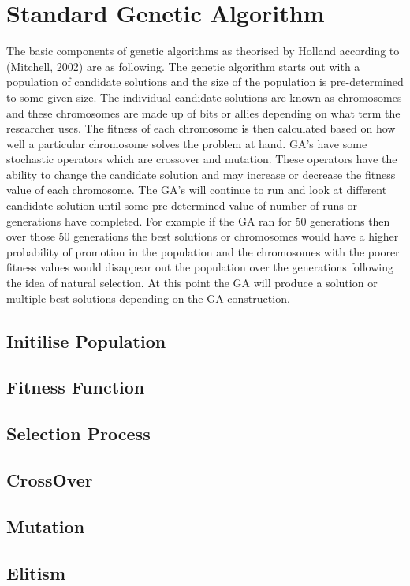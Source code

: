 \section{Standard Genetic Algorithm}
The basic components of genetic algorithms as theorised by Holland according to (Mitchell, 2002) are as following. The genetic algorithm starts out with a population of candidate solutions and the size of the population is pre-determined to some given size.  The individual candidate solutions are known as chromosomes and these chromosomes are made up of bits or allies depending on what term the researcher uses. The fitness of each chromosome is then calculated based on how well a particular chromosome solves the problem at hand.  GA’s have some stochastic operators which are crossover and mutation. These operators have the ability to change the candidate solution and may increase or decrease the fitness value of each chromosome. The GA’s will continue to run and look at different candidate solution until some pre-determined value of number of runs or generations have completed.  For example if the GA ran for 50 generations then over those 50 generations the best solutions or chromosomes would have a higher probability of promotion in the population and the chromosomes with the poorer fitness values would disappear out the population over the generations following the idea of natural selection.  At this point the GA will produce a solution or multiple best solutions depending on the GA construction.
\subsection{Initilise Population}
\subsection{Fitness Function}
\subsection{Selection Process}
\subsection{CrossOver}
\subsection{Mutation}
\subsection{Elitism}
